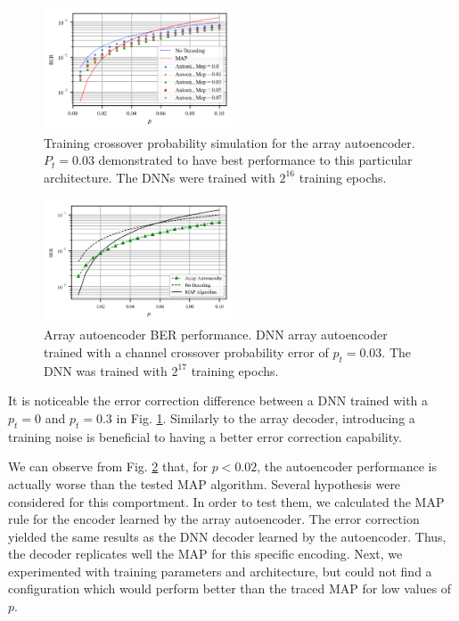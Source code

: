 \documentclass[conference]{IEEEtran}
\begin{document}
\begin{figure}[!ht]
  \centering
    \includegraphics[width=0.5\textwidth]{images/MAP_AutoencoderArray_Mep_65536_64_128_256_p_analysis}
    \caption{Training crossover probability simulation for the array autoencoder. $P_t=0.03$ demonstrated to have best performance to this particular architecture. The DNNs were trained with $2^{16}$ training epochs.}\label{fig:parrayanalysis}
\end{figure}


\begin{figure}[!ht]
  \centering
    \includegraphics[width=0.5\textwidth]{images/AutoencoderArray_Mep_65536_ptrain_003_logcosh}
    \caption{Array autoencoder BER performance. DNN array autoencoder trained with a channel crossover probability error of $p_t=0.03$. The DNN was trained with $2^{17}$ training epochs.}\label{fig:arrayautoencoder}
\end{figure}

It is noticeable the error correction difference between a DNN trained with a $p_t=0$ and $p_t=0.3$ in Fig. \ref{fig:parrayanalysis}. Similarly to the array decoder, introducing a training noise is beneficial to having a better error correction capability. 

We can observe from Fig. \ref{fig:arrayautoencoder} that, for $p<0.02$, the autoencoder performance is actually worse than the tested MAP algorithm. Several hypothesis were considered for this comportment. In order to test them, we calculated the MAP rule for the encoder learned by the array autoencoder. The error correction yielded the same results as the DNN decoder learned by the autoencoder. Thus, the decoder replicates well the MAP for this specific encoding. Next, we experimented with training parameters and architecture, but could not find a configuration which would perform better than the traced MAP for low values of $p$.
\end{document}
